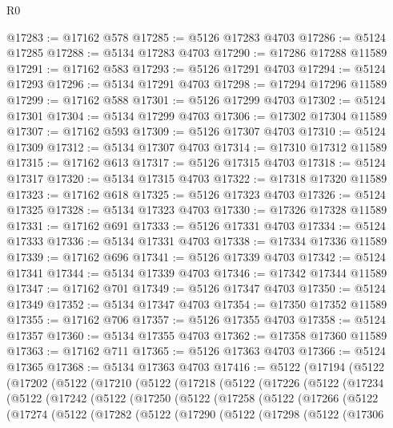 \begin{lexlean}{R0}
\begin{coremodule}
@17283 := @17162 @578
@17285 := @5126 @17283 @4703
@17286 := @5124 @17285
@17288 := @5134 @17283 @4703
@17290 := @17286 @17288 @11589
@17291 := @17162 @583
@17293 := @5126 @17291 @4703
@17294 := @5124 @17293
@17296 := @5134 @17291 @4703
@17298 := @17294 @17296 @11589
@17299 := @17162 @588
@17301 := @5126 @17299 @4703
@17302 := @5124 @17301
@17304 := @5134 @17299 @4703
@17306 := @17302 @17304 @11589
@17307 := @17162 @593
@17309 := @5126 @17307 @4703
@17310 := @5124 @17309
@17312 := @5134 @17307 @4703
@17314 := @17310 @17312 @11589
@17315 := @17162 @613
@17317 := @5126 @17315 @4703
@17318 := @5124 @17317
@17320 := @5134 @17315 @4703
@17322 := @17318 @17320 @11589
@17323 := @17162 @618
@17325 := @5126 @17323 @4703
@17326 := @5124 @17325
@17328 := @5134 @17323 @4703
@17330 := @17326 @17328 @11589
@17331 := @17162 @691
@17333 := @5126 @17331 @4703
@17334 := @5124 @17333
@17336 := @5134 @17331 @4703
@17338 := @17334 @17336 @11589
@17339 := @17162 @696
@17341 := @5126 @17339 @4703
@17342 := @5124 @17341
@17344 := @5134 @17339 @4703
@17346 := @17342 @17344 @11589
@17347 := @17162 @701
@17349 := @5126 @17347 @4703
@17350 := @5124 @17349
@17352 := @5134 @17347 @4703
@17354 := @17350 @17352 @11589
@17355 := @17162 @706
@17357 := @5126 @17355 @4703
@17358 := @5124 @17357
@17360 := @5134 @17355 @4703
@17362 := @17358 @17360 @11589
@17363 := @17162 @711
@17365 := @5126 @17363 @4703
@17366 := @5124 @17365
@17368 := @5134 @17363 @4703
@17416 := @5122
    (@17194
      (@5122
        (@17202
          (@5122
            (@17210
              (@5122
                (@17218
                  (@5122
                    (@17226
                      (@5122
                        (@17234
                          (@5122
                            (@17242
                              (@5122
                                (@17250
                                  (@5122
                                    (@17258
                                      (@5122
                                        (@17266
                                          (@5122
                                            (@17274
                                              (@5122
                                                (@17282
                                                  (@5122
                                                    (@17290
                                                      (@5122
                                                        (@17298
                                                          (@5122
                                                            (@17306

\end{coremodule}
\end{lexlean}
